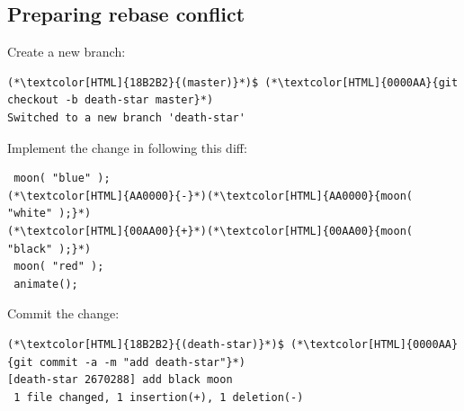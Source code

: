 \subsection{Preparing rebase conflict}
\begin{frame}[fragile]
  \subslidetitle

  Create a new  branch:
  \begin{lstlisting}
(*\textcolor[HTML]{18B2B2}{(master)}*)$ (*\textcolor[HTML]{0000AA}{git checkout -b death-star master}*)
Switched to a new branch 'death-star'
\end{lstlisting}

  Implement the change in  following this diff:

  \begin{lstlisting}
 moon( "blue" );
(*\textcolor[HTML]{AA0000}{-}*)(*\textcolor[HTML]{AA0000}{moon( "white" );}*)
(*\textcolor[HTML]{00AA00}{+}*)(*\textcolor[HTML]{00AA00}{moon( "black" );}*)
 moon( "red" );
 animate();
\end{lstlisting}

  Commit the change:
  \begin{lstlisting}
(*\textcolor[HTML]{18B2B2}{(death-star)}*)$ (*\textcolor[HTML]{0000AA}{git commit -a -m "add death-star"}*)
[death-star 2670288] add black moon
 1 file changed, 1 insertion(+), 1 deletion(-)
\end{lstlisting}
\end{frame}







